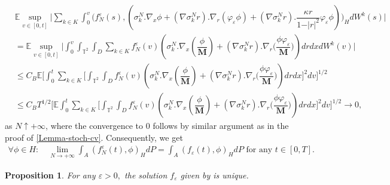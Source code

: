 \documentclass[a4paper,12pt, reqno]{amsart}
\newcommand{\E}{\ensuremath{\mathbb{E}}}
\newtheorem{proposition}[theorem]{Proposition}
\begin{document}
    \begin{align*}
        &\E\sup_{v\in[0,t]}\vert \sum_{k\in K}\int_0^v\big(f_N^\varepsilon(s),( \sigma_k^N.\nabla_x\phi +(\nabla \sigma_k^Nr).\nabla_r (\varphi_\varepsilon\phi)+(\nabla \sigma_k^Nr).\dfrac{\kappa r}{1-\vert r\vert^2}\varphi_\varepsilon\phi)\big)_HdW^k(s)\vert\\
        &=\E\sup_{v\in[0,t]}\vert \int_0^v\int_{\mathbb{T}^2}\int_{D} \sum_{k\in K}f_N^\varepsilon(v)( \sigma_k^N.\nabla_x(\dfrac{\phi}{\mathbf{M}}) +(\nabla \sigma_k^Nr).\nabla_r\big(\dfrac{\phi \varphi_\varepsilon}{\mathbf{M}}\big)) drdxdW^k(v) \vert\\
        &\leq  C_B \E\Big[ \int_0^t \sum_{k\in K}\big[\int_{\mathbb{T}^2}\int_{D} f_N^\varepsilon(v)( \sigma_k^N.\nabla_x(\dfrac{\phi}{\mathbf{M}}) +(\nabla \sigma_k^Nr).\nabla_r\big(\dfrac{\phi \varphi_\varepsilon}{\mathbf{M}}\big)) drdx\big]^2dv\Big]^{1/2}\\
        &\leq C_BT^{1/2}\Big[\E \int_0^t \sum_{k\in K}\big[\int_{\mathbb{T}^2}\int_{D} f_N^\varepsilon(v)( \sigma_k^N.\nabla_x(\dfrac{\phi}{\mathbf{M}}) +(\nabla \sigma_k^Nr).\nabla_r\big(\dfrac{\phi \varphi_\varepsilon}{\mathbf{M}}\big)) drdx\big]^2dv\Big]^{1/2} \to 0,
    \end{align*}
as $N\uparrow+\infty$, where the convergence to $0$ follows by similar argument as in the proof of  \autoref{Lemma-stoch-cv}. Consequently, we get 
\begin{align*}
  \forall \phi\in H: \quad      \lim_{N\to+\infty}   \int_A(f_N^\varepsilon(t), \phi )_HdP=\int_A (f_\varepsilon(t), \phi )_H dP\text{ for any } t\in [0,T].
\end{align*}
     \begin{proposition}\label{prop-uniq-1}
          For any $\varepsilon>0,$ the solution $f_\varepsilon$ given by  is unique.     
    \end{proposition}
\end{document}
